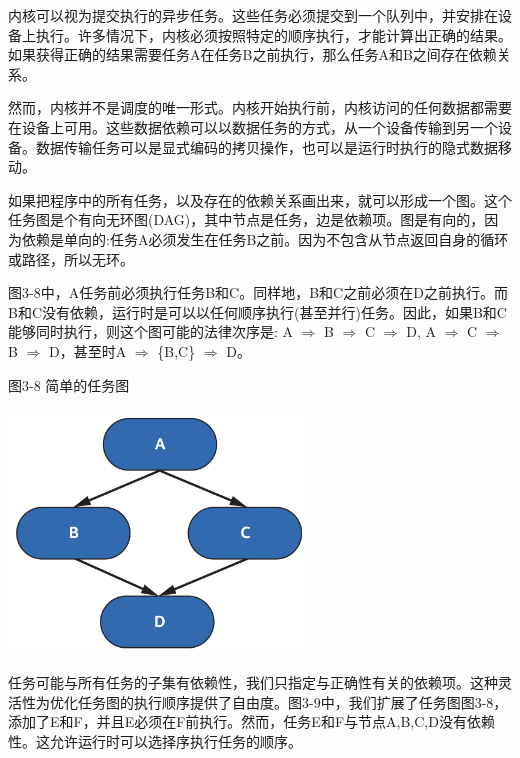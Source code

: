 内核可以视为提交执行的异步任务。这些任务必须提交到一个队列中，并安排在设备上执行。许多情况下，内核必须按照特定的顺序执行，才能计算出正确的结果。如果获得正确的结果需要任务A在任务B之前执行，那么任务A和B之间存在依赖关系。\par
 
然而，内核并不是调度的唯一形式。内核开始执行前，内核访问的任何数据都需要在设备上可用。这些数据依赖可以以数据任务的方式，从一个设备传输到另一个设备。数据传输任务可以是显式编码的拷贝操作，也可以是运行时执行的隐式数据移动。\par

如果把程序中的所有任务，以及存在的依赖关系画出来，就可以形成一个图。这个任务图是个有向无环图(DAG)，其中节点是任务，边是依赖项。图是有向的，因为依赖是单向的:任务A必须发生在任务B之前。因为不包含从节点返回自身的循环或路径，所以无环。\par

图3-8中，A任务前必须执行任务B和C。同样地，B和C之前必须在D之前执行。而B和C没有依赖，运行时是可以以任何顺序执行(甚至并行)任务。因此，如果B和C能够同时执行，则这个图可能的法律次序是: A $\Rightarrow$ B $\Rightarrow$ C $\Rightarrow$ D, A $\Rightarrow$ C $\Rightarrow$ B $\Rightarrow$ D，甚至时A $\Rightarrow$ \{B,C\} $\Rightarrow$ D。\par

\hspace*{\fill} \par %
图3-8 简单的任务图
\begin{center}
	\includegraphics[width=0.6\textwidth]{content/chapter-3/images/4}
\end{center}

任务可能与所有任务的子集有依赖性，我们只指定与正确性有关的依赖项。这种灵活性为优化任务图的执行顺序提供了自由度。图3-9中，我们扩展了任务图图3-8，添加了E和F，并且E必须在F前执行。然而，任务E和F与节点A,B,C,D没有依赖性。这允许运行时可以选择序执行任务的顺序。\par

